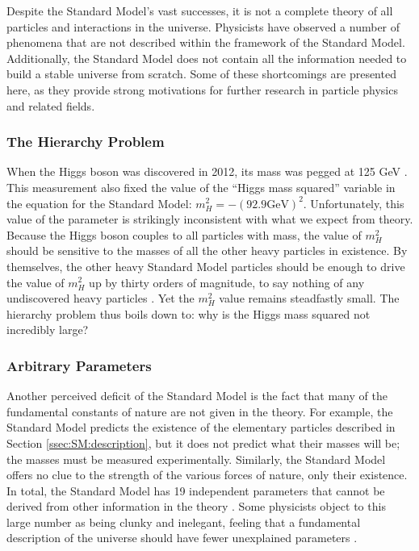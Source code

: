 Despite the Standard Model's vast successes, it is not a complete
theory of all particles and interactions in the universe. Physicists
have observed a number of phenomena that are not described within the
framework of the Standard Model. Additionally, the Standard Model does
not contain all the information needed to build a stable universe from
scratch. Some of these shortcomings are presented here, as they provide
strong motivations for further research in particle physics and
related fields.

\subsubsection*{The Hierarchy Problem}
When the Higgs boson was discovered in 2012, its mass was pegged at
125 GeV \cite{jointhiggs}. This measurement also fixed the value of
the ``Higgs mass squared'' variable in the equation for the Standard
Model: $m_H^2 = -(92.9 \text{GeV})^2$. Unfortunately, this value of
the parameter is strikingly inconsistent with what we expect from
theory. Because the Higgs boson couples to all particles with mass, the value
of $m_H^2$ should be sensitive to the masses of all the other heavy
particles in existence. By themselves, the other heavy Standard Model
particles should be enough to drive the value of $m_H^2$ up by thirty
orders of magnitude, to say nothing of any undiscovered heavy
particles \cite{susyprimer}. Yet the $m_H^2$ value remains steadfastly
small. The hierarchy problem thus boils down to: why is the Higgs mass
squared not incredibly large?

\subsubsection*{Arbitrary Parameters}
Another perceived deficit of the Standard Model is the fact that many
of the fundamental constants of nature are not given in the theory. For
example, the Standard Model predicts the existence of the elementary
particles described in Section \ref{ssec:SM:description}, but it does
not predict what their masses will be;
the masses must be measured experimentally. Similarly, the Standard
Model offers no clue to the strength of the various forces of nature,
only their existence. In total, the Standard Model has 19 independent
parameters that cannot be derived from other information in the theory
\cite{smparams}. Some physicists object to this large number as being clunky
and inelegant, feeling that a fundamental description of the universe
should have fewer unexplained parameters \cite{griffiths}.

